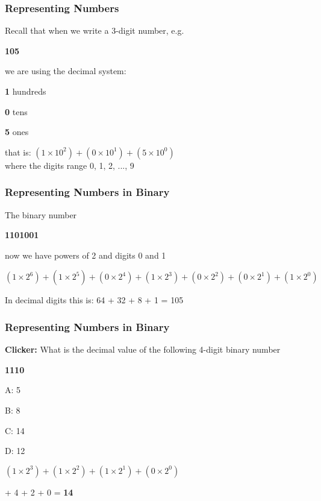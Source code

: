 \documentclass[12pt]{beamer}\usepackage[]{graphicx}\usepackage[]{color}
\begin{document}

\begin{frame}
\frametitle{Representing Numbers}

Recall that when we write a 3-digit number, e.g. \\
\begin{center}
{\large \textbf{105}}
\end{center}

\pause
we are using the decimal system:
\bi
  \item \textbf{1} hundreds
  \item \textbf{0} tens
  \item \textbf{5} ones
\ei

that is: $(1 \times 10^2) + (0 \times 10^1) + (5 \times 10^0)$ \\
{\footnotesize where the digits range 0, 1, 2, ..., 9}

\end{frame}


\begin{frame}
\frametitle{Representing Numbers in Binary}

The binary number \\
\begin{center}
{\large \textbf{1101001}}
\end{center}

\pause
now we have powers of 2 and digits 0 and 1 \\

\bigskip

$(1 \times 2^6) + (1 \times 2^5) + (0 \times 2^4) + 
(1 \times 2^3) + (0 \times 2^2) + (0 \times 2^1) + (1 \times 2^0)$

\pause
\bigskip
In decimal digits this is: 64 + 32 + 8 + 1 = 105
\end{frame}


\begin{frame}
\frametitle{Representing Numbers in Binary}

{\hilit \textbf{Clicker:}} What is the decimal value of the following 4-digit binary number \\
\begin{center}
{\large \textbf{1110}}
\end{center}

\bi
  \item A: 5
  \item B: 8
  \item C: 14
  \item D: 12
\ei

\pause
\bigskip

$(1 \times 2^3) + (1 \times 2^2) + (1 \times 2^1) + (0 \times 2^0)$

\pause
{} + 4 + 2 + 0 = \textbf{14}
\end{frame}
\end{document}
